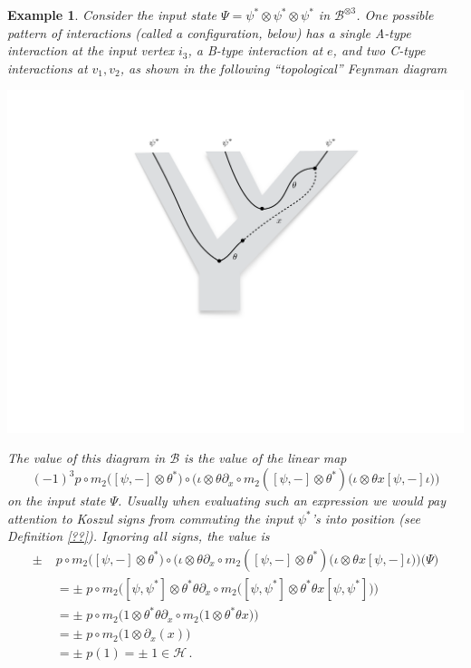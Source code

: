 \documentclass[english,letter paper,12pt,leqno]{article}
\theoremstyle{example}
\newtheorem{example}[theorem]{Example}
\numberwithin{equation}{section}
\def\be{\begin{equation}}
\def\ee{\end{equation}}
\begin{document}
\begin{example}
Consider the input state $\Psi = \psi^* \otimes \psi^* \otimes \psi^*$ in $\mathscr{B}^{\otimes 3}$. One possible pattern of interactions (called a configuration, below) has a single A-type interaction at the input vertex $i_3$, a B-type interaction at $e$, and two C-type interactions at $v_1,v_2$, as shown in the following ``topological'' Feynman diagram
\begin{center}
\includegraphics[scale=0.3]{dia6}
\end{center}
The \emph{value} of this diagram in $\mathscr{B}$ is the value of the linear map
\be\label{eq:operator_tree_example}
(-1)^3 p \circ m_2 \big([\psi, -] \otimes \theta^*\big) \circ \big( \iota \otimes \theta \partial_x \circ m_2 ([\psi, -] \otimes \theta^*)\big( \iota \otimes \theta x [\psi, -] \iota \big)\big)
\ee
on the input state $\Psi$. Usually when evaluating such an expression we would pay attention to Koszul signs from commuting the input $\psi^*$'s into position (see Definition \ref{??}). Ignoring all signs, the value is
\begin{align*}
\pm \; & p \circ m_2 \big([\psi, -] \otimes \theta^*\big) \circ \big( \iota \otimes \theta \partial_x \circ m_2 ([\psi, -] \otimes \theta^*)\big( \iota \otimes \theta x [\psi, -] \iota \big)\big)\Big( \Psi \Big)\\
&= \pm \; p \circ m_2 \big([\psi, \psi^*] \otimes \theta^* \theta \partial_x \circ m_2 ([\psi, \psi^*] \otimes \theta^* \theta x [\psi, \psi^*] \big)\big)\\
&= \pm \; p \circ m_2 \big(1 \otimes \theta^* \theta \partial_x \circ m_2 (1 \otimes \theta^* \theta x \big)\big)\\
&= \pm \; p \circ m_2 \big(1 \otimes \partial_x(x) \big)\\
&= \pm \; p(1) = \pm \; 1 \in \mathscr{H}\,.
\end{align*}
\end{example}
\end{document}
